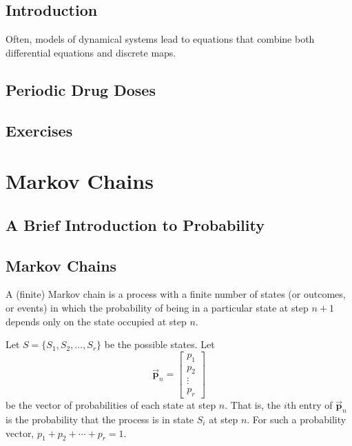 \documentclass[reqno]{immbook}
\newcommand{\BP}{\vec{\textbf{p}}}
\begin{document}
\section{Introduction}
Often, models of dynamical systems lead to equations that combine
both differential equations and discrete maps.
\section{Periodic Drug Doses}
\section{Exercises}
%
%
%
\chapter{Markov Chains}
\section{A Brief Introduction to Probability}
\section{Markov Chains}

A (finite) Markov chain is a process with a finite
number of states (or outcomes, or events) in which
the probability of being in a particular state
at step $n+1$ depends only on the state occupied
at step $n$.

Let $S = \{S_1,S_2,\ldots,S_r\}$ be the possible states.
Let
\begin{equation}
   \BP_n = \begin{bmatrix}
               p_1 \\ p_2 \\ \vdots \\ p_r
           \end{bmatrix}
\end{equation}
be the vector  of probabilities of each state
at step $n$. That is, the $i$th entry of $\BP_n$
is the probability that the process is in
state $S_i$ at step $n$.
For such a probability vector, $p_1+p_2+\cdots+p_r = 1$.
\end{document}
